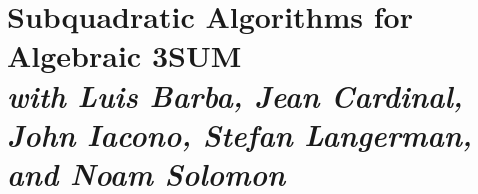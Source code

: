 \chapter%
[Subquadratic Algorithms for Algebraic 3SUM]%
{Subquadratic Algorithms for Algebraic 3SUM\\[1ex]
\normalfont\footnotesize\itshape with
Luis Barba,
Jean Cardinal,
John Iacono,
Stefan Langerman,
and
Noam Solomon}%
\label{paper:3pol-algorithm}



